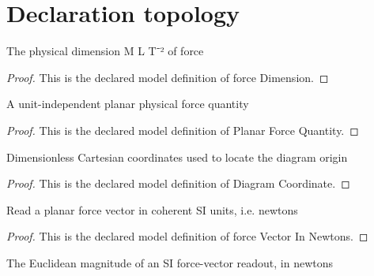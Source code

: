 \section{Declaration topology}
\begin{definition}
  \label{def:physics:phyx-mini-0677:phyxminiproblems-problemphyxmini0677-forcedimension}
  The physical dimension M L T⁻² of force
\end{definition}
\begin{proof}
  This is the declared model definition of force Dimension.
\end{proof}
\begin{definition}
  \label{def:physics:phyx-mini-0677:phyxminiproblems-problemphyxmini0677-planarforcequantity}
  A unit-independent planar physical force quantity
\end{definition}
\begin{proof}
  This is the declared model definition of Planar Force Quantity.
\end{proof}
\begin{definition}
  \label{def:physics:phyx-mini-0677:phyxminiproblems-problemphyxmini0677-diagramcoordinate}
  Dimensionless Cartesian coordinates used to locate the diagram origin
\end{definition}
\begin{proof}
  This is the declared model definition of Diagram Coordinate.
\end{proof}
\begin{definition}
  \label{def:physics:phyx-mini-0677:phyxminiproblems-problemphyxmini0677-forcevectorinnewtons}
  Read a planar force vector in coherent SI units, i.e. newtons
\end{definition}
\begin{proof}
  This is the declared model definition of force Vector In Newtons.
\end{proof}
\begin{definition}
  \label{def:physics:phyx-mini-0677:phyxminiproblems-problemphyxmini0677-forcemagnitudeinnewtons}
  The Euclidean magnitude of an SI force-vector readout, in newtons
\end{definition}
